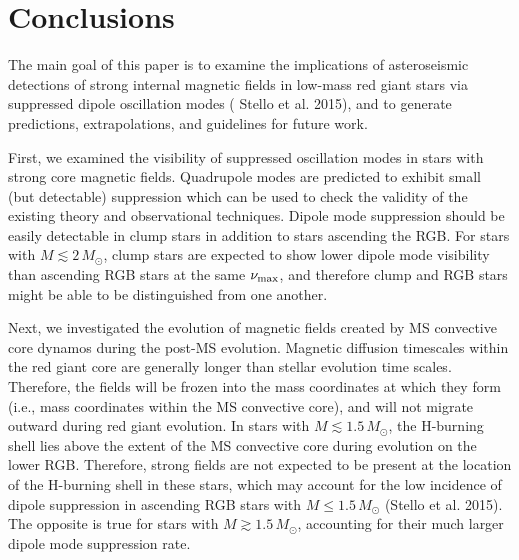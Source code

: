 \section{Conclusions}
\label{conclusion}

The main goal of this paper is to examine the implications of asteroseismic detections of strong internal magnetic fields in low-mass red giant stars via suppressed dipole oscillation modes (\cite{Fuller_2015} Stello et al. 2015), and to generate predictions, extrapolations, and guidelines for future work. 

First, we examined the visibility of suppressed oscillation modes in stars with strong core magnetic fields. Quadrupole modes are predicted to exhibit small (but detectable) suppression which can be used to check the validity of the existing theory and observational techniques. Dipole mode suppression should be easily detectable in clump stars in addition to stars ascending the RGB. For stars with $M \lesssim 2 \, M_\odot$, clump stars are expected to show lower dipole mode visibility than ascending RGB stars at the same $\nu_{\rm max}$, and therefore clump and RGB stars might be able to be distinguished from one another.

Next, we investigated the evolution of magnetic fields created by MS convective core dynamos during the post-MS evolution. Magnetic diffusion timescales within the red giant core are generally longer than stellar evolution time scales. Therefore, the fields will be frozen into the mass coordinates at which they form (i.e., mass coordinates within the MS convective core), and will not migrate outward during red giant evolution. In stars with $M \lesssim 1.5 \, M_\odot$, the H-burning shell lies above the extent of the MS convective core during evolution on the lower RGB. Therefore, strong fields are not expected to be present at the location of the H-burning shell in these stars, which may account for the low incidence of dipole suppression in ascending RGB stars with $M \leq 1.5 \, M_\odot$ (Stello et al. 2015). The opposite is true for stars with $M \gtrsim 1.5 \, M_\odot$, accounting for their much larger dipole mode suppression rate.

